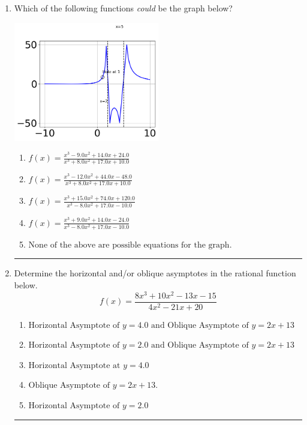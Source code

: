 \documentclass[14pt]{extbook}
\newcommand{\litem}[1]{\item#1\hspace*{-1cm}\rule{\textwidth}{0.4pt}}
\begin{document}
\begin{enumerate}
{\begin{enumerate}[label=\Alph*.]
\end{enumerate} }
\litem{
Which of the following functions \textit{could} be the graph below?
\begin{center}
    \includegraphics[width=0.5\textwidth]{../Figures/identifyGraphOfRationalFunctionB.png}
\end{center}
\begin{enumerate}[label=\Alph*.]
\item \( f(x)=\frac{x^{3} -9.0 x^{2} +14.0 x + 24.0}{x^{3} +8.0 x^{2} +17.0 x + 10.0} \)
\item \( f(x)=\frac{x^{3} -12.0 x^{2} +44.0 x -48.0}{x^{3} +8.0 x^{2} +17.0 x + 10.0} \)
\item \( f(x)=\frac{x^{3} +15.0 x^{2} +74.0 x + 120.0}{x^{3} -8.0 x^{2} +17.0 x -10.0} \)
\item \( f(x)=\frac{x^{3} +9.0 x^{2} +14.0 x -24.0}{x^{3} -8.0 x^{2} +17.0 x -10.0} \)
\item \( \text{None of the above are possible equations for the graph.} \)

\end{enumerate} }
\litem{
Determine the horizontal and/or oblique asymptotes in the rational function below.\[ f(x) = \frac{8x^{3} +10 x^{2} -13 x -15}{4x^{2} -21 x + 20} \]\begin{enumerate}[label=\Alph*.]
\item \( \text{Horizontal Asymptote of } y = 4.0 \text{ and Oblique Asymptote of } y = 2x + 13 \)
\item \( \text{Horizontal Asymptote of } y = 2.0 \text{ and Oblique Asymptote of } y = 2x + 13 \)
\item \( \text{Horizontal Asymptote at } y = 4.0 \)
\item \( \text{Oblique Asymptote of } y = 2x + 13. \)
\item \( \text{Horizontal Asymptote of } y = 2.0  \)

\end{enumerate} }
\end{enumerate}
\end{document}
